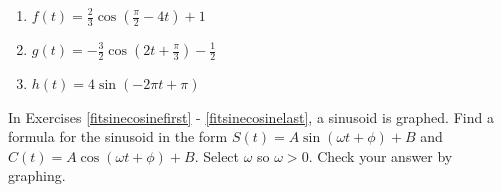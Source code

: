 \begin{multicols}{3}

\begin{enumerate}

\setcounter{enumi}{\value{HW}}

\item $f(t) = \frac{2}{3} \cos \left( \frac{\pi}{2} - 4t \right) + 1$
\item $g(t) = -\frac{3}{2} \cos \left( 2t + \frac{\pi}{3} \right) - \frac{1}{2}$
\item $h(t) = 4\sin (-2\pi t + \pi)$   \label{sinecosinegraphlast}

\setcounter{HW}{\value{enumi}}

\end{enumerate}

\end{multicols}

In Exercises \ref{fitsinecosinefirst} - \ref{fitsinecosinelast},  a sinusoid is graphed. Find a formula for the sinusoid in the form $S(t) = A \sin(\omega t + \phi) + B$ and $C(t) = A \cos(\omega t + \phi) + B$.  Select $\omega$ so  $\omega > 0$. Check your answer by graphing.

